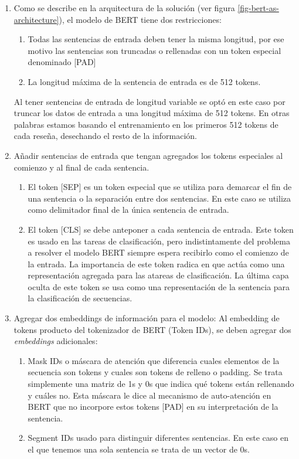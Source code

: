 \begin{enumerate}
    \item Como se describe en la arquitectura de la solución (ver figura \ref{fig-bert-as-architecture}), el modelo de BERT tiene dos restricciones:
    \begin{enumerate}
    \item Todas las sentencias de entrada deben tener la misma longitud, por ese motivo las sentencias son truncadas o rellenadas con un token especial denominado [PAD]
    \item La longitud máxima de la sentencia de entrada es de 512 tokens.
    \end{enumerate}
    Al tener sentencias de entrada de longitud variable se optó en este caso por truncar los datos de entrada a una longitud máxima de 512 tokens. En otras palabras estamos basando el entrenamiento en los primeros 512 tokens de cada reseña, desechando el resto de la información. 
    \item Añadir sentencias de entrada que tengan agregados los tokens especiales al comienzo y al final de cada sentencia.
    \begin{enumerate}
    \item El token [SEP] es un token especial que se utiliza para demarcar el fin de una sentencia o la separación entre dos sentencias. En este caso se utiliza como delimitador final de la única sentencia de entrada.
    \item El token [CLS] se debe anteponer a cada sentencia de entrada. Este token es usado en las tareas de clasificación, pero indistintamente del problema a resolver el modelo BERT siempre espera recibirlo como el comienzo de la entrada. La importancia de este token radica en que actúa como una representación agregada para las atareas de clasificación. La última capa oculta de este token se usa como una representación de la sentencia para la clasificación de secuencias.
    \end{enumerate}
    \item Agregar dos embeddings de información para el modelo:
    Al embedding de tokens producto del tokenizador de BERT (Token IDs), se deben agregar dos \textit{embeddings} adicionales:
    \begin{enumerate}
    \item Mask IDs o máscara de atención que diferencia cuales elementos de la secuencia son tokens y cuales son tokens de relleno o padding. Se trata simplemente una matriz de 1s y 0s que indica qué tokens están rellenando y cuáles no. Esta máscara le dice al mecanismo de auto-atención en BERT que no incorpore estos tokens [PAD] en su interpretación de la sentencia.
    \item Segment IDs usado para distinguir diferentes sentencias. En este caso en el que tenemos una sola sentencia se trata de un vector de 0s.
    \end{enumerate}
\end{enumerate}

